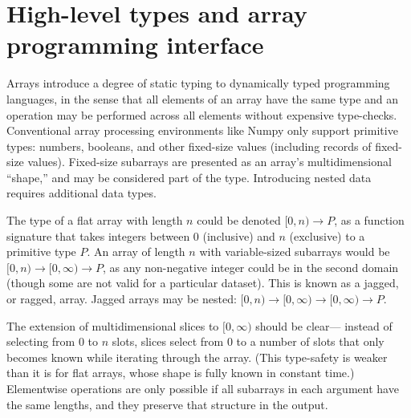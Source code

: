 \documentclass{webofc}
\begin{document}


\section{High-level types and array programming interface}

Arrays introduce a degree of static typing to dynamically typed programming languages, in the sense that all elements of an array have the same type and an operation may be performed across all elements without expensive type-checks. Conventional array processing environments like Numpy only support primitive types: numbers, booleans, and other fixed-size values (including records of fixed-size values). Fixed-size subarrays are presented as an array's multidimensional ``shape,'' and may be considered part of the type. Introducing nested data requires additional data types.

The type of a flat array with length $n$ could be denoted $[0, n) \to P$, as a function signature that takes integers between $0$ (inclusive) and $n$ (exclusive) to a primitive type $P$. An array of length $n$ with variable-sized subarrays would be $[0, n) \to [0, \infty) \to P$, as any non-negative integer could be in the second domain (though some are not valid for a particular dataset). This is known as a jagged, or ragged, array. Jagged arrays may be nested: $[0, n) \to [0, \infty) \to [0, \infty) \to P$.

The extension of multidimensional slices to $[0, \infty)$ should be clear--- instead of selecting from $0$ to $n$ slots, slices select from $0$ to a number of slots that only becomes known while iterating through the array. (This type-safety is weaker than it is for flat arrays, whose shape is fully known in constant time.) Elementwise operations are only possible if all subarrays in each argument have the same lengths, and they preserve that structure in the output.
\end{document}
